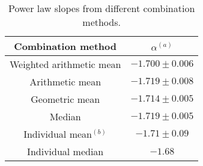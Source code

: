 \begin{table}
\centering
\begin{center}
\caption{Power law slopes from different combination methods.}
\begin{tabular}{cc}
\hline
\noalign{\smallskip}
Combination method &  $\alpha$$^{(a)}$ \\  
\hline


Weighted arithmetic mean  & $-1.700\pm 0.006$   \\
Arithmetic mean  & $-1.719\pm 0.008$   \\
Geometric mean  & $-1.714\pm 0.005$   \\
Median  & $-1.719\pm 0.005$   \\




Individual mean$^{(b)}$  & $-1.71\pm 0.09$   \\
Individual median & $-1.68$   \\


\hline
\hline
\end{tabular}
\end{center}


\end{table}



